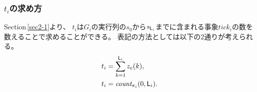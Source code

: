 \documentclass[ 10pt]{jsarticle}
\newcommand{\req}[1]{\eqref{#1}}
\newcommand{\rsec}[1]{Section\,\ref{#1}}
\newcommand{\Count}{{\sf Count}}
\newcommand{\tick}{{\sf tick}}
\newcommand{\Len}{{\sf L}}
\begin{document}
\begin{comment}
%
%
%
%

[対処方法２]
仕様に
\begin{align}
\Box_{[0,\Len_i]}\left( \phi_i\to\Diamond_{[0,0]}\textit{Fin}\right).\label{eq:spec}
\end{align}
を追加する。この仕様は、$\phi_i$を満たしたならば、次の\textit{tick}が生起するまでに$s'$に遷移しなくてはならないことを表す。ここで、$\Diamond_{[0,0]}\textit{Fin}$は次の$\tick$が生起するまでに状態$s'$に到達することを表す。


したがって、最終的に$i$番目の下位TDESに与える仕様$\phi_i''$は、
$\phi_i''=\phi_i
\land\left\{(\lnot \textit{Fin})U_{[0,\Len_i]}\phi_i \right\}
\land\left\{ \Box_{[0,\Len_i]}\left( \phi_i\to\Diamond_{[0,0]}\textit{Fin}\right)\right\}$となる。

$G_{i,act}'$、$\phi_i'$、$\Len_i$から実行列$\pi_i$を得る。
そして、Hard制約を満たすために最低限必要な時間$t_i$を$t_i=\textit{count}_{\pi_i}(0,\Len_i)$とする。
これの正当性は、
\begin{itemize}
\item
\req{eq:spec}より、$\phi_i$が満たされたら次の事象\textit{tick}が生起するまでに$s'$に遷移する。
%
\item
\req{eq:fin}より、$s'$に遷移したら二度と\textit{tick}が生起できない。
\end{itemize}
ということからきている。

この方法では、最適化関数

%
%
\begin{algorithm}
\caption{Find an execution of a two-level hierarchical TDES} \label{alg4}
\begin{algorithmic}
\Require $\mathcal{G}$ (two-level hierarchical TDES), $\phi$, $\Psi$, $\phi_1,\ldots,\phi_M$, $f_1,\ldots,f_M$, $\Count$, $\Len$
\Ensure All executions $\pi$, $\pi_{i}$ 
\For{$i \in [1,\ M]$}
\State $\pi_i=$Find($G_i$,$\phi_i$,$\Len$)
\State get $t_i$
\State $m_i=\lceil t_i\frac{\tick_p}{\tick_i} \rceil$
\EndFor
\State $\bm{m}=(m_1,\ldots,m_M)$

\State $\pi=$Find($G$,$\phi(\bm{m})$,$\Psi(\bm{m})$,$\Len$)


\end{algorithmic}
\end{algorithm}
%
%
%
%
\end{comment}
%
%
\subsubsection{$t_i$の求め方}
%
%
\rsec{sec2-1}より、
$t_i$は$G_i$の実行列の$s_0$から$s_{\Len_i}$までに含まれる事象$\textit{tick}_i$の数を数えることで求めることができる。
表記の方法としては以下の2通りが考えられる。
\begin{align}
&t_i=\sum_{k=1}^{\Len_i}z_e(k),\\
&t_i=\textit{count}_{\pi_i}(0,\Len_i).
\end{align}
%
\end{document}

